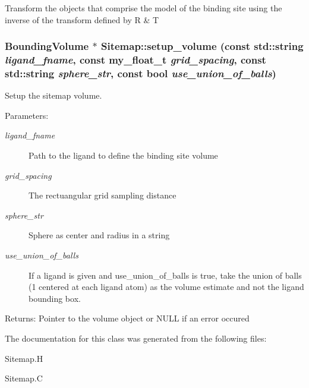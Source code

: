 Transform the objects that comprise the model of the binding site using the inverse of the transform defined by R \& T 
\subsubsection{\setlength{\rightskip}{0pt plus 5cm}\bf{Bounding\-Volume} $\ast$ Sitemap::setup\_\-volume (const std::string {\em ligand\_\-fname}, const my\_\-float\_\-t {\em grid\_\-spacing}, const std::string {\em sphere\_\-str}, const bool {\em use\_\-union\_\-of\_\-balls})\hspace{0.3cm}{\tt  [private]}}\label{classASCbase_1_1Sitemap_dbc5be7e837523050ebf38da9fca1d1f}


Setup the sitemap volume. 

\begin{Desc}
\item[Parameters:]
\begin{description}
\item[{\em ligand\_\-fname}]Path to the ligand to define the binding site volume \item[{\em grid\_\-spacing}]The rectuangular grid sampling distance \item[{\em sphere\_\-str}]Sphere as center and radius in a string \item[{\em use\_\-union\_\-of\_\-balls}]If a ligand is given and use\_\-union\_\-of\_\-balls is true, take the union of balls (1 centered at each ligand atom) as the volume estimate and not the ligand bounding box. \end{description}
\end{Desc}
\begin{Desc}
\item[Returns:]Pointer to the volume object or NULL if an error occured \end{Desc}


The documentation for this class was generated from the following files:\begin{CompactItemize}
\item 
Sitemap.H\item 
Sitemap.C\end{CompactItemize}
